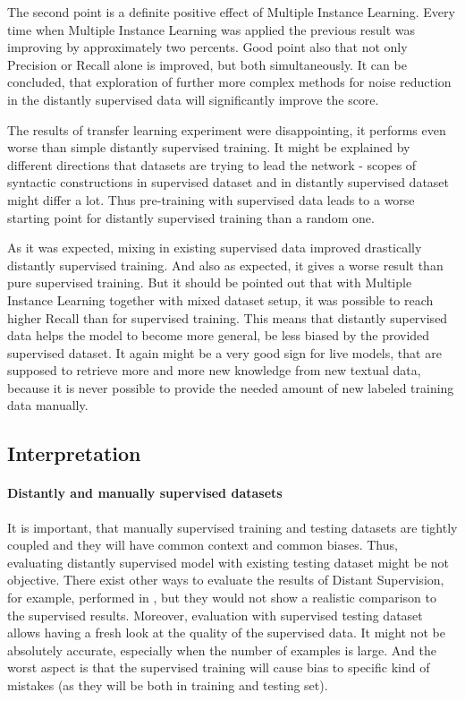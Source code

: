 The second point is a definite positive effect of Multiple Instance Learning. Every time when Multiple Instance Learning was applied the previous result 
was improving by approximately two percents. Good point also that not only Precision or 
Recall alone is improved, but both simultaneously. It can be concluded, that exploration of further more complex 
methods for noise reduction in the distantly supervised data will significantly improve the score. 

The results of transfer learning experiment were disappointing, it performs even worse than 
simple distantly supervised training. It might be explained by different directions that datasets
are trying to lead the network - scopes of syntactic constructions in supervised dataset and in 
distantly supervised dataset might differ a lot. Thus pre-training with supervised data leads to a worse starting point for 
distantly supervised training than a random one.

As it was expected, mixing in existing supervised data improved drastically distantly 
supervised training. And also as expected, it gives a worse result than pure supervised training. But it should be 
pointed out that with Multiple Instance Learning together with mixed dataset setup, it was possible to reach higher Recall than for supervised 
training. This means that distantly supervised data helps the model to become more general, be 
less biased by the provided supervised dataset. It again might be a very good sign for live models, 
that are supposed to retrieve more and more new knowledge from new textual data, because
it is never possible to provide the needed amount of new labeled training data manually. 

\subsection{Interpretation}
\paragraph{Distantly and manually supervised datasets}
It is important, that manually supervised training and testing datasets are tightly coupled and they will have common 
context and common biases. Thus, evaluating distantly supervised model with existing testing
dataset might be not objective. There exist other ways to evaluate the results of Distant Supervision, for example, 
performed in \cite{Mintz:2009:DSR:1690219.1690287}, but they would not show a realistic comparison to the 
supervised results. Moreover, evaluation with supervised testing dataset allows having a fresh look at the 
quality of the supervised data. It might not be absolutely accurate, especially when the number of examples
is large. And the worst aspect is that the supervised training will cause bias to specific kind of mistakes (as they 
will be both in training and testing set).

